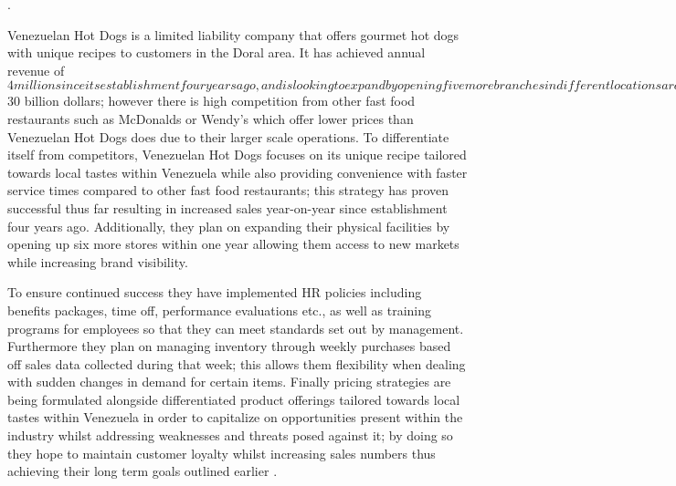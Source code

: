 .

Venezuelan Hot Dogs is a limited liability company that offers gourmet hot dogs with unique recipes to customers in the Doral area. It has achieved annual revenue of $4 million since its establishment four years ago, and is looking to expand by opening five more branches in different locations around Miami. To achieve these goals, it plans on marketing campaigns targeting the Venezuelan community living in the Doral area through social media, digital campaigns, word-of-mouth advertising, and fliers distributed at malls nearby. 

The market for Venezuelan Hot Dogs' products are large with an estimated size of $30 billion dollars; however there is high competition from other fast food restaurants such as McDonalds or Wendy's which offer lower prices than Venezuelan Hot Dogs does due to their larger scale operations. To differentiate itself from competitors, Venezuelan Hot Dogs focuses on its unique recipe tailored towards local tastes within Venezuela while also providing convenience with faster service times compared to other fast food restaurants; this strategy has proven successful thus far resulting in increased sales year-on-year since establishment four years ago. Additionally, they plan on expanding their physical facilities by opening up six more stores within one year allowing them access to new markets while increasing brand visibility. 

To ensure continued success they have implemented HR policies including benefits packages, time off, performance evaluations etc., as well as training programs for employees so that they can meet standards set out by management. Furthermore they plan on managing inventory through weekly purchases based off sales data collected during that week; this allows them flexibility when dealing with sudden changes in demand for certain items. Finally pricing strategies are being formulated alongside differentiated product offerings tailored towards local tastes within Venezuela in order to capitalize on opportunities present within the industry whilst addressing weaknesses and threats posed against it; by doing so they hope to maintain customer loyalty whilst increasing sales numbers thus achieving their long term goals outlined earlier .